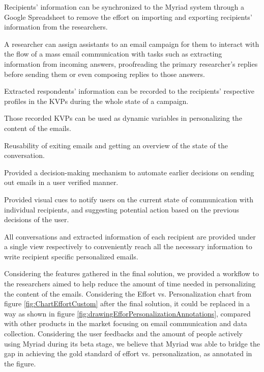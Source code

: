 \begin{compactitem}
	\item Recipients' information can be synchronized to the Myriad system through a Google Spreadsheet to remove the effort on importing and exporting recipients' information from the researchers.
	\item A researcher can assign assistants to an email campaign for them to interact with the flow of a mass email communication with tasks such as extracting information from incoming answers, proofreading the primary researcher's replies before sending them or even composing replies to those answers.
	\item Extracted respondents' information can be recorded to the recipients' respective profiles in the \ac{KVP}s during the whole state of a campaign. 
	\item Those recorded \ac{KVP}s can be used as dynamic variables in personalizing the content of the emails.
	\item Reusability of exiting emails and getting an overview of the state of the conversation.
	\item Provided a decision-making mechanism to automate earlier decisions on sending out emails in a user verified manner.
	\item Provided visual cues to notify users on the current state of communication with individual recipients, and suggesting potential action based on the previous decisions of the user.
	\item All conversations and extracted information of each recipient are provided under a single view respectively to conveniently reach all the necessary information to write recipient specific personalized emails.
 \end{compactitem}

Considering the features gathered in the final solution, we provided a workflow to the researchers aimed to help reduce the amount of time needed in personalizing the content of the emails. Considering the Effort vs. Personalization chart from figure \ref{fig:ChartEffortCustom} after the final solution, it could be replaced in a way as shown in figure \ref{fig:drawingEfforPersonalizationAnnotations}, compared with other products in the market focusing on email communication and data collection. Considering the user feedbacks and the amount of people actively using Myriad during its beta stage, we believe that Myriad was able to bridge the gap in achieving the gold standard of effort vs. personalization, as annotated in the figure.
\vspace{1cm}

